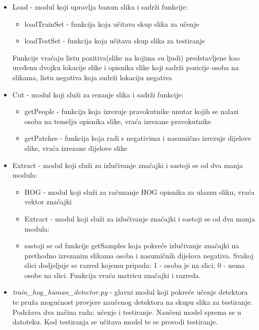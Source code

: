 \documentclass[utf8, seminar, numeric, times]{fer}
\begin{document}
\begin{itemize}

\item Load - modul koji upravlja bazom slika i sadrži funkcije:
\begin{itemize}
	\item loadTrainSet - funkcija koja učitava skup slika za učenje
	\item loadTestSet - funkcija koja učitava skup slika za testiranje
\end{itemize}

	Funkcije vraćaju listu pozitiva(slike na kojima su ljudi) predstavljene kao uređenu dvojku lokacije slike i opisnika slike koji sadrži pozicije osoba na slikama, listu negativa koja sadrži lokaciju negativa


\item Cut - modul koji služi za rezanje slika i sadrži funkcije:
\begin{itemize}
\item getPeople - funkcija koja izrezuje pravokutnike unutar kojih se nalazi osoba na temelju opisnika slike, vraća izrezane pravokutnike
\item getPatches - funkcija koja radi s negativima i nasumično izrezuje dijelove slike, vraća izrezane dijelove slike 
\end{itemize}

\item Extract - modul koji služi za izlučivanje značajki i sastoji se od dva manja modula:
\begin{itemize}
 \item HOG - modul koji služi za računanje HOG opisnika za ulaznu sliku, vraća vektor značajki
 \item Extract - modul koji služi za izlučivanje značajki i sastoji se od dva manja modula:
 \item sastoji se od funkcije getSamples koja pokreće izlučivanje značajki na prethodno izrezanim slikama osoba i nasumičnih dijelova negativa. Svakoj slici dodjeljuje se razred kojemu pripada: 1 - osoba je na slici, 0 - nema osobe na slici. Funkcija vraća matricu značajki i razreda. 
\end{itemize}

\item \emph{train\_hog\_human\_detector.py} - glavni modul koji pokreće učenje detektora te pruža mogućnost provjere naučenog detektora na skupu slika za testiranje.
	Podržava dva načina rada: učenje i testiranje. Naučeni model sprema se u datoteku. Kod testiranja se  učitava model te se provodi testiranje.

\end{itemize}
\end{document}
